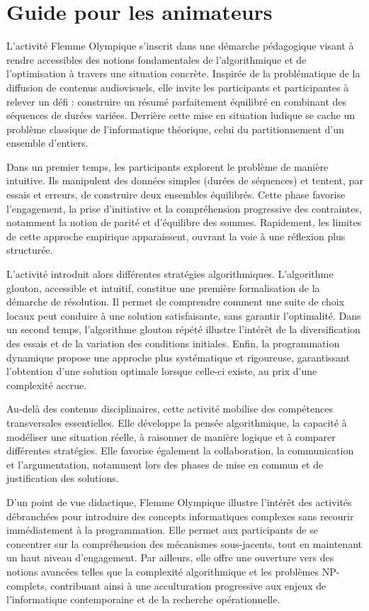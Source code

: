 \documentclass[a4paper,twoside]{article}
\begin{document}
\appendix

\section{Guide pour les animateurs}

L'activité Flemme Olympique s'inscrit dans une démarche pédagogique visant à rendre accessibles des notions fondamentales de l'algorithmique et de l'optimisation à travers une situation concrète. Inspirée de la problématique de la diffusion de contenus audiovisuels, elle invite les participants et participantes à relever un défi : construire un résumé parfaitement équilibré en combinant des séquences de durées variées. Derrière cette mise en situation ludique se cache un problème classique de l'informatique théorique, celui du partitionnement d'un ensemble d'entiers.

Dans un premier temps, les participants explorent le problème de manière intuitive. Ils manipulent des données simples (durées de séquences) et tentent, par essais et erreurs, de construire deux ensembles équilibrés. Cette phase favorise l'engagement, la prise d'initiative et la compréhension progressive des contraintes, notamment la notion de parité et d'équilibre des sommes. Rapidement, les limites de cette approche empirique apparaissent, ouvrant la voie à une réflexion plus structurée.

L'activité introduit alors différentes stratégies algorithmiques. L'algorithme glouton, accessible et intuitif, constitue une première formalisation de la démarche de résolution. Il permet de comprendre comment une suite de choix locaux peut conduire à une solution satisfaisante, sans garantir l'optimalité. Dans un second temps, l'algorithme glouton répété illustre l'intérêt de la diversification des essais et de la variation des conditions initiales. Enfin, la programmation dynamique propose une approche plus systématique et rigoureuse, garantissant l'obtention d'une solution optimale lorsque celle-ci existe, au prix d'une complexité accrue.

Au-delà des contenus disciplinaires, cette activité mobilise des compétences transversales essentielles. Elle développe la pensée algorithmique, la capacité à modéliser une situation réelle, à raisonner de manière logique et à comparer différentes stratégies. Elle favorise également la collaboration, la communication et l'argumentation, notamment lors des phases de mise en commun et de justification des solutions.

D'un point de vue didactique, Flemme Olympique illustre l'intérêt des activités débranchées pour introduire des concepts informatiques complexes sans recourir immédiatement à la programmation. Elle permet aux participants de se concentrer sur la compréhension des mécanismes sous-jacents, tout en maintenant un haut niveau d'engagement. Par ailleurs, elle offre une ouverture vers des notions avancées telles que la complexité algorithmique et les problèmes NP-complets, contribuant ainsi à une acculturation progressive aux enjeux de l'informatique contemporaine et de la recherche opérationnelle.
\end{document}
